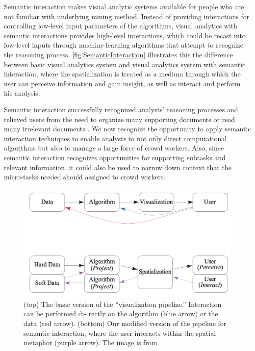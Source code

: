 \documentclass[journal]{vgtc}                %
\begin{document}
Semantic interaction makes visual analytic systems available for people who are not familiar with underlying mining method. Instead of providing interactions for controlling low-level input parameters of the algorithms, visual analytics with semantic interactions provides high-level interactions, which could be recast into low-level inputs through machine learning algorithms that attempt to recognize the reasoning process. \autoref{fig:SemanticInteraction} illustrates this the difference between basic visual analytics system and visual analytics system with semantic interaction, where the spatialization is treated as a medium through which the user can perceive information and gain insight, as well as interact and perform his analysis.

Semantic interaction successfully recognized analysts’ reasoning processes and relieved users from the need to organize many supporting documents or read many irrelevant documents \cite{Endert:2012wq}. We now recognize the opportunity to apply semantic interaction techniques to enable analysts to not only direct computational algorithms but also to manage a large force of crowd workers. Also, since semantic interaction recognizes opportunities for supporting subtasks and relevant information, it could also be used to narrow down context that the micro-tasks needed should assigned to crowd workers.

\begin{figure}[tb]
 \centering %
 \includegraphics[width=\columnwidth]{SemanticInteraction}
 \caption{ (top) The basic version of the “visualization pipeline.” Interaction can be performed di- rectly on the algorithm (blue arrow) or the data (red arrow). (bottom) Our modified version of the pipeline for semantic interaction, where the user interacts within the spatial metaphor (purple arrow). The image is from \cite{Endert:2016co}}

 \label{fig:SemanticInteraction}
\end{figure}
\end{document}
